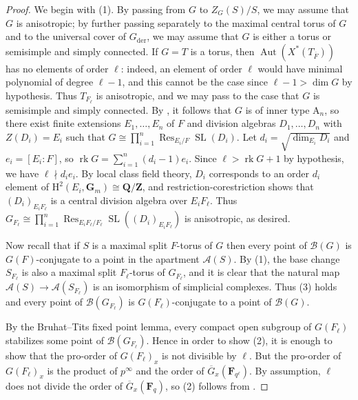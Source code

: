 \documentclass[reqno]{amsart}
\numberwithin{equation}{subsection}
\newcommand{\F}{\mathbf{F}}
\newcommand{\G}{\mathbf{G}}
\newcommand{\Q}{\mathbf{Q}}
\newcommand{\Z}{\mathbf{Z}}
\newcommand{\ol}[1]{\overline{#1}}
\newcommand{\co}{\colon}
\newcommand\cA{\mathcal{A}}
\newcommand\cB{\mathcal{B}}
\DeclareMathOperator{\SL}{SL}
\DeclareMathOperator{\Aut}{Aut}
\DeclareMathOperator{\Res}{Res}
\DeclareMathOperator{\rk}{rk}
\newcommand{\rH}{\ensuremath{\mathrm{H}}\xspace}
\theoremstyle{remark}
\numberwithin{equation}{subsection}
\numberwithin{figure}{subsection}
\begin{document}
\begin{proof}
    We begin with (1). By passing from $G$ to $Z_G(S)/S$, we may assume that $G$ is anisotropic; by further passing separately to the maximal central torus of $G$ and to the universal cover of $G_{\mathrm{der}}$, we may assume that $G$ is either a torus or semisimple and simply connected. If $G = T$ is a torus, then $\Aut(X^*(T_{\ol F}))$ has no elements of order $\ell$: indeed, an element of order $\ell$ would have minimal polynomial of degree $\ell - 1$, and this cannot be the case since $\ell - 1 > \dim G$ by hypothesis. Thus $T_{F_\ell}$ is anisotropic, and we may pass to the case that $G$ is semisimple and simply connected. By \cite[Remark 10.3.2]{KP}, it follows that $G$ is of inner type $\mathrm{A}_n$, so there exist finite extensions $E_1, \dots, E_n$ of $F$ and division algebras $D_1, \dots, D_n$ with $Z(D_i) = E_i$ such that $G \cong \prod_{i=1}^n \Res_{E_i/F} \SL(D_i)$. Let $d_i = \sqrt{\dim_{E_i} D_i}$ and $e_i = [E_i\co F]$, so $\rk G = \sum_{i=1}^n (d_i - 1)e_i$. Since $\ell > \rk G + 1$ by hypothesis, we have $\ell \nmid d_ie_i$. By local class field theory, $D_i$ corresponds to an order $d_i$ element of $\rH^2(E_i, \G_m) \cong \Q/\Z$, and restriction-corestriction shows that $(D_i)_{E_i F_\ell}$ is a central division algebra over $E_i F_\ell$. Thus $G_{F_\ell} \cong \prod_{i=1}^n \Res_{E_i F_\ell/F_\ell} \SL((D_i)_{E_i F_\ell})$ is anisotropic, as desired.

    Now recall that if $S$ is a maximal split $F$-torus of $G$ then every point of $\cB(G)$ is $G(F)$-conjugate to a point in the apartment $\cA(S)$. By (1), the base change $S_{F_\ell}$ is also a maximal split $F_\ell$-torus of $G_{F_\ell}$, and it is clear that the natural map $\cA(S) \to \cA(S_{F_\ell})$ is an isomorphism of simplicial complexes. Thus (3) holds and every point of $\cB(G_{F_\ell})$ is $G(F_\ell)$-conjugate to a point of $\cB(G)$.
    
    By the Bruhat--Tits fixed point lemma, every compact open subgroup of $G(F_\ell)$ stabilizes some point of $\cB(G_{F_\ell})$. Hence in order to show (2), it is enough to show that the pro-order of $G(F_\ell)_x$ is not divisible by $\ell$. But the pro-order of $G(F_\ell)_x$ is the product of $p^\infty$ and the order of $\ol G_x(\F_{q^\ell})$. By assumption, $\ell$ does not divide the order of $\ol G_x(\F_q)$, so (2) follows from \cite[Lemma~2.1]{Cot26a}.


\end{proof}
\end{document}
